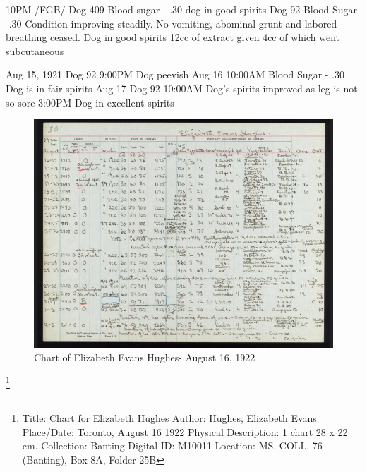 \documentclass[12pt]{article}
\begin{document}
10PM /FGB/
Dog 409 Blood sugar - .30
dog in good spirits
Dog 92 Blood Sugar -.30
Condition improving steadily. No vomiting, abominal grunt and labored breathing ceased. 
Dog in good spirits
12cc of extract given 4cc of which went subcutaneous

Aug 15, 1921
Dog 92 
9:00PM 
Dog peevish
Aug 16
10:00AM 
Blood Sugar - .30
Dog is in fair spirits
Aug 17 Dog 92
10:00AM
Dog's spirits improved as leg is not so sore
3:00PM
Dog in excellent spirits



\begin{figure}[H]
\centering
 \includegraphics [width=5.5in]{Hughes_Chart}
  \caption{Chart of Elizabeth Evans Hughes- August 16, 1922}
  \label{fig:Elizabeth Evans Hughes' Chart}
\end{figure}
\footnote{Title: Chart for Elizabeth Hughes
Author: Hughes, Elizabeth Evans
Place/Date: Toronto, August 16 1922
Physical Description: 1 chart 28 x 22 cm.
Collection: Banting
Digital ID: M10011
Location: MS. COLL. 76 (Banting), Box 8A, Folder 25B}
\end{document}
